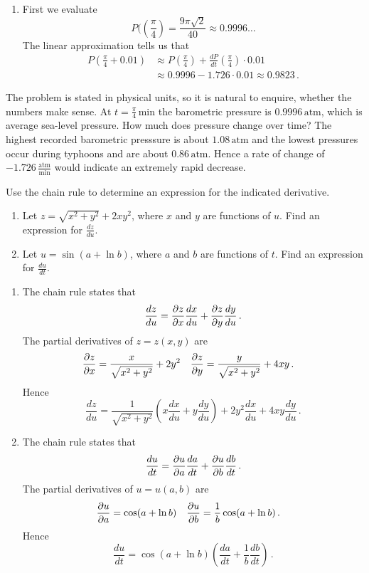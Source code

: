 \begin{solution}
\begin{enumerate}
\item
First we evaluate
\[
P(\left(\frac \pi 4 \right) = \frac{9\pi\sqrt 2}{40} \approx 0.9996\ldots
\]
The linear approximation tells us that
\begin{align*}
P\left( \frac \pi 4 + 0.01 \right) &\approx P\left(\frac \pi 4 \right) 
+ \frac{dP}{dt}\left(\frac \pi 4 \right) \cdot 0.01 \\
&\approx 0.9996 - 1.726 \cdot 0.01 \approx 0.9823\,.
\end{align*}
\end{enumerate}
The problem is stated in physical units, so it is natural to enquire, whether the numbers make sense. At $t=\frac \pi 4 \,\textrm{min}$ the barometric pressure is $0.9996 \,\textrm{atm}$, which is average sea-level pressure. How much does pressure change over time? The highest recorded barometric presssure is about $1.08 \,\textrm{atm}$ and the lowest pressures occur during typhoons and are about $0.86 \,\textrm{atm}$. Hence a rate of change of $-1.726 \,\frac{\textrm{atm}}{\textrm{min}}$ would indicate an extremely rapid decrease.
\end{solution}

\begin{question}
Use the chain rule to determine an expression for the indicated derivative.
\begin{enumerate}
\item
Let $z=\sqrt{x^2+y^2}+2xy^2$, where $x$ and $y$ are functions of $u$. Find an expression for $\frac{dz}{du}$.
\item
Let $u =\sin\left(a + \ln b\right)$, where $a$ and $b$ are functions of $t$. Find an expression for $\frac{du}{dt}$.
\end{enumerate}
\end{question}

\begin{solution}
\begin{enumerate}
\item
The chain rule states that
\[
\frac{dz}{du} = \frac{\partial z}{\partial x}\frac{dx}{du}
+ \frac{\partial z}{\partial y}\frac{dy}{du}\,.
\]
The partial derivatives of $z=z(x,y)$ are
\begin{align*}
\frac{\partial z}{\partial x} &=
\frac{x}{\sqrt{x^2+y^2}} + 2y^2 &
\frac{\partial z}{\partial y} &=
\frac{y}{\sqrt{x^2+y^2}} + 4xy\,.
\end{align*}
Hence
\[
\frac{dz}{du} = \frac{1}{\sqrt{x^2+y^2}}
\left( x \frac{dx}{du} + y \frac{dy}{du} \right)
+ 2y^2 \frac{dx}{du} + 4xy \frac{dy}{du}\,.
\]
\item
The chain rule states that
\[
\frac{du}{dt} = \frac{\partial u}{\partial a}\frac{da}{dt}
+ \frac{\partial u}{\partial b}\frac{db}{dt}\,.
\]
The partial derivatives of $u=u(a,b)$ are
\begin{align*}
\frac{\partial u}{\partial a} &=
\cos(a + \ln b) &
\frac{\partial u}{\partial b} &=
\frac 1b \cos(a + \ln b) \,.
\end{align*}
Hence
\[
\frac{du}{dt} = \cos(a + \ln b) 
\left( \frac{da}{dt} + \frac 1b \frac{db}{dt} \right)\,.
\]
\end{enumerate}
\end{solution}

